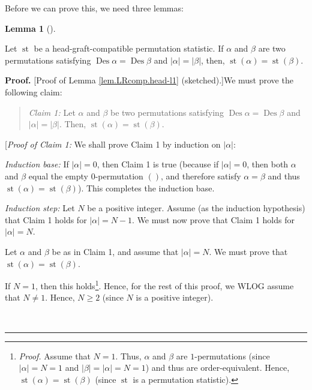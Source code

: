 \documentclass[numbers=enddot,12pt,final,onecolumn,notitlepage]{scrartcl}%
\theoremstyle{definition}
\newtheorem{lem}[theo]{Lemma}
\newenvironment{lemma}[1][]
{\begin{lem}[#1]\begin{leftbar}}
{\end{leftbar}\end{lem}}
\newenvironment{statement}{\begin{quote}}{\end{quote}}
\newenvironment{proof}[1][Proof]{\noindent\textbf{#1.} }{\ \rule{0.5em}{0.5em}}
\newenvironment{verlong}{}{}
\begin{document}
\begin{verlong}
Before we can prove this, we need three lemmas:

\begin{lemma}
\label{lem.LRcomp.head-l1}Let $\operatorname*{st}$ be a head-graft-compatible
permutation statistic. If $\alpha$ and $\beta$ are two permutations satisfying
$\operatorname*{Des}\alpha=\operatorname*{Des}\beta$ and $\left\vert
\alpha\right\vert =\left\vert \beta\right\vert $, then, $\operatorname*{st}%
\left(  \alpha\right)  =\operatorname*{st}\left(  \beta\right)  $.
\end{lemma}

\begin{proof}
[Proof of Lemma \ref{lem.LRcomp.head-l1} (sketched).]We must prove the
following claim:

\begin{statement}
\textit{Claim 1:} Let $\alpha$ and $\beta$ be two permutations satisfying
$\operatorname*{Des}\alpha=\operatorname*{Des}\beta$ and $\left\vert
\alpha\right\vert =\left\vert \beta\right\vert $. Then, $\operatorname*{st}%
\left(  \alpha\right)  =\operatorname*{st}\left(  \beta\right)  $.
\end{statement}

[\textit{Proof of Claim 1:} We shall prove Claim 1 by induction on $\left\vert
\alpha\right\vert $:

\textit{Induction base:} If $\left\vert \alpha\right\vert =0$, then Claim 1 is
true (because if $\left\vert \alpha\right\vert =0$, then both $\alpha$ and
$\beta$ equal the empty $0$-permutation $\left(  {}\right)  $, and therefore
satisfy $\alpha=\beta$ and thus $\operatorname*{st}\left(  \alpha\right)
=\operatorname*{st}\left(  \beta\right)  $). This completes the induction base.

\textit{Induction step:} Let $N$ be a positive integer. Assume (as the
induction hypothesis) that Claim 1 holds for $\left\vert \alpha\right\vert
=N-1$. We must now prove that Claim 1 holds for $\left\vert \alpha\right\vert
=N$.

Let $\alpha$ and $\beta$ be as in Claim 1, and assume that $\left\vert
\alpha\right\vert =N$. We must prove that $\operatorname*{st}\left(
\alpha\right)  =\operatorname*{st}\left(  \beta\right)  $.

If $N=1$, then this holds\footnote{\textit{Proof.} Assume that $N=1$. Thus,
$\alpha$ and $\beta$ are $1$-permutations (since $\left\vert \alpha\right\vert
=N=1$ and $\left\vert \beta\right\vert =\left\vert \alpha\right\vert =N=1$)
and thus are order-equivalent. Hence, $\operatorname*{st}\left(
\alpha\right)  =\operatorname*{st}\left(  \beta\right)  $ (since
$\operatorname*{st}$ is a permutation statistic).}. Hence, for the rest of
this proof, we WLOG assume that $N\neq1$. Hence, $N\geq2$ (since $N$ is a
positive integer).


\end{proof}
\end{verlong}
\end{document}
